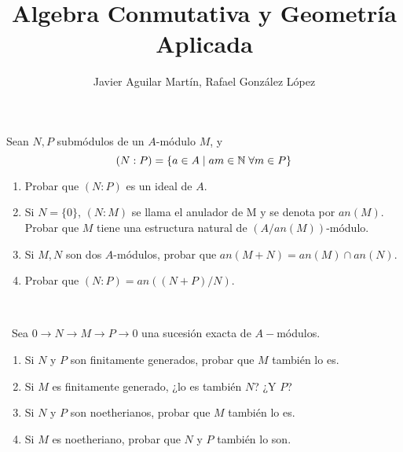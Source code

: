 \documentclass[twoside]{article}
\begin{document}
\title{Algebra Conmutativa y Geometría Aplicada}
\author{Javier Aguilar Martín, Rafael González López}
\maketitle

\begin{ejercicio}{2}
Sean $N,P$ submódulos de un $A$-módulo $M$, y $$(N:P) = \{a\in A\mid am\in \mathbb{N} \;\forall m \in P\}$$
\begin{enumerate}
\item Probar que $(N:P)$ es un ideal de $A$.
\item Si $N=\{0\}$, $(N:M)$ se llama el anulador de M y se denota por $an(M)$. Probar que $M$ tiene una estructura natural de $(A/an(M))$-módulo.
\item Si $M,N$ son dos $A$-módulos, probar que $an(M+N)=an(M)\cap an(N)$.
\item Probar que $(N:P)=an((N+P)/N)$.
\end{enumerate}
\end{ejercicio}
\begin{solucion}\
\end{solucion}
\newpage
\begin{ejercicio}{3}\
Sea $0 \to N \to M \to P \to 0$ una sucesión exacta de $A-$módulos.
\begin{enumerate}
\item Si $N$ y $P$ son finitamente generados, probar que $M$ también lo es.
\item Si $M$ es finitamente generado, ¿lo es también $N$? ¿Y $P$?
\item Si $N$ y $P$ son noetherianos, probar que $M$ también lo es.
\item Si $M$ es noetheriano, probar que $N$ y $P$ también lo son.
\end{enumerate}
\end{ejercicio}
\end{document}
